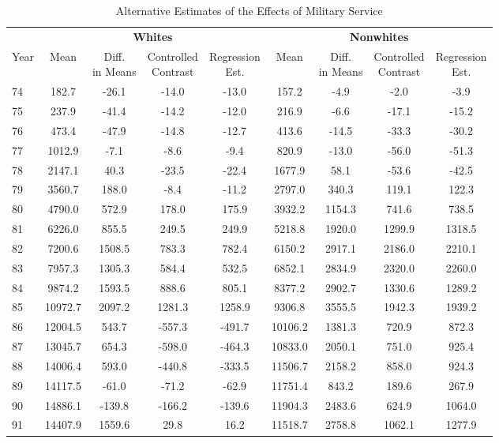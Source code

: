 \documentclass[12pt]{article}
\begin{document}
\begin{table}[H]
\centering
\caption{Alternative Estimates of the Effects of Military Service}
\scriptsize
\begin{tabular}{lcccccccc}
\hline
 & \multicolumn{4}{c}{\textbf{Whites}} & \multicolumn{4}{c}{\textbf{Nonwhites}} \\
\cline{2-5} \cline{6-9}
Year & Mean 
     & \shortstack{Diff. \\ in Means} 
     & \shortstack{Controlled \\ Contrast} 
     & \shortstack{Regression \\ Est.} 
     & Mean 
     & \shortstack{Diff. \\ in Means} 
     & \shortstack{Controlled \\ Contrast} 
     & \shortstack{Regression \\ Est.} \\
\hline
74 & 182.7  & -26.1 & -14.0 & -13.0 & 157.2  & -4.9 & -2.0 & -3.9 \\
75 & 237.9  & -41.4 & -14.2 & -12.0 & 216.9  & -6.6 & -17.1 & -15.2 \\
76 & 473.4  & -47.9 & -14.8 & -12.7 & 413.6  & -14.5 & -33.3 & -30.2 \\
77 & 1012.9 & -7.1  & -8.6  & -9.4  & 820.9  & -13.0 & -56.0 & -51.3 \\
78 & 2147.1 & 40.3  & -23.5 & -22.4 & 1677.9 & 58.1 & -53.6 & -42.5 \\
79 & 3560.7 & 188.0 & -8.4  & -11.2 & 2797.0 & 340.3 & 119.1 & 122.3 \\
80 & 4790.0 & 572.9 & 178.0 & 175.9 & 3932.2 & 1154.3 & 741.6 & 738.5 \\
81 & 6226.0 & 855.5 & 249.5 & 249.9 & 5218.8 & 1920.0 & 1299.9 & 1318.5 \\
82 & 7200.6 & 1508.5 & 783.3 & 782.4 & 6150.2 & 2917.1 & 2186.0 & 2210.1 \\
83 & 7957.3 & 1305.3 & 584.4 & 532.5 & 6852.1 & 2834.9 & 2320.0 & 2260.0 \\
84 & 9874.2 & 1593.5 & 888.6 & 805.1 & 8377.2 & 2902.7 & 1330.6 & 1289.2 \\
85 & 10972.7 & 2097.2 & 1281.3 & 1258.9 & 9306.8 & 3555.5 & 1942.3 & 1939.2 \\
86 & 12004.5 & 543.7 & -557.3 & -491.7 & 10106.2 & 1381.3 & 720.9 & 872.3 \\
87 & 13045.7 & 654.3 & -598.0 & -464.3 & 10833.0 & 2050.1 & 751.0 & 925.4 \\
88 & 14006.4 & 593.0 & -440.8 & -333.5 & 11506.7 & 2158.2 & 858.0 & 924.3 \\
89 & 14117.5 & -61.0 & -71.2 & -62.9 & 11751.4 & 843.2 & 189.6 & 267.9 \\
90 & 14886.1 & -139.8 & -166.2 & -139.6 & 11904.3 & 2483.6 & 624.9 & 1064.0 \\
91 & 14407.9 & 1559.6 & 29.8 & 16.2 & 11518.7 & 2758.8 & 1062.1 & 1277.9 \\
\hline
\end{tabular}
\end{table}
\end{document}
